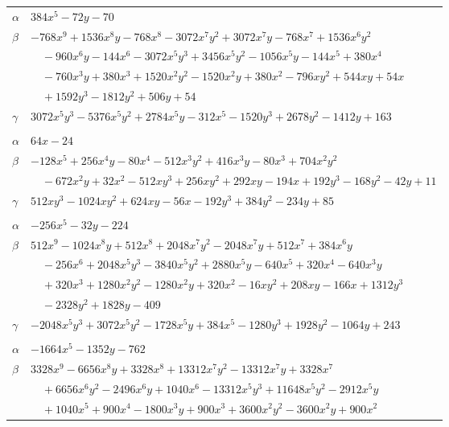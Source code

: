 \documentclass[11pt]{article}
\begin{document}
\begin{longtable}{@{}ll@{}}
$\alpha$ & $384x^{5}-72y-70$\\
$\beta$ & $-768x^{9}+1536x^{8}y-768x^{8}-3072x^{7}y^{2}+3072x^{7}y-768x^{7}+1536x^{6}y^{2}$\\
 & $\quad -960x^{6}y-144x^{6}-3072x^{5}y^{3}+3456x^{5}y^{2}-1056x^{5}y-144x^{5}+380x^{4}$\\
 & $\quad -760x^{3}y+380x^{3}+1520x^{2}y^{2}-1520x^{2}y+380x^{2}-796xy^{2}+544xy+54x$\\
 & $\quad +1592y^{3}-1812y^{2}+506y+54$\\
$\gamma$ & $3072x^{5}y^{3}-5376x^{5}y^{2}+2784x^{5}y-312x^{5}-1520y^{3}+2678y^{2}-1412y+163$\\
\addlinespace[3pt]
\multicolumn{2}{@{}l}{$\{i,j\}=\{3,31\}$, $k_{ij}=2\cdot 7^{2}$}\\
$\alpha$ & $64x-24$\\
$\beta$ & $-128x^{5}+256x^{4}y-80x^{4}-512x^{3}y^{2}+416x^{3}y-80x^{3}+704x^{2}y^{2}$\\
 & $\quad -672x^{2}y+32x^{2}-512xy^{3}+256xy^{2}+292xy-194x+192y^{3}-168y^{2}-42y+11$\\
$\gamma$ & $512xy^{3}-1024xy^{2}+624xy-56x-192y^{3}+384y^{2}-234y+85$\\
\addlinespace[3pt]
\multicolumn{2}{@{}l}{$\{i,j\}=\{3,34\}$, $k_{ij}=3\cdot 7^{2}$}\\
$\alpha$ & $-256x^{5}-32y-224$\\
$\beta$ & $512x^{9}-1024x^{8}y+512x^{8}+2048x^{7}y^{2}-2048x^{7}y+512x^{7}+384x^{6}y$\\
 & $\quad -256x^{6}+2048x^{5}y^{3}-3840x^{5}y^{2}+2880x^{5}y-640x^{5}+320x^{4}-640x^{3}y$\\
 & $\quad +320x^{3}+1280x^{2}y^{2}-1280x^{2}y+320x^{2}-16xy^{2}+208xy-166x+1312y^{3}$\\
 & $\quad -2328y^{2}+1828y-409$\\
$\gamma$ & $-2048x^{5}y^{3}+3072x^{5}y^{2}-1728x^{5}y+384x^{5}-1280y^{3}+1928y^{2}-1064y+243$\\
\addlinespace[3pt]
\multicolumn{2}{@{}l}{$\{i,j\}=\{3,37\}$, $k_{ij}=2^{2}\cdot 3^{2}\cdot 5^{2}$}\\
$\alpha$ & $-1664x^{5}-1352y-762$\\
$\beta$ & $3328x^{9}-6656x^{8}y+3328x^{8}+13312x^{7}y^{2}-13312x^{7}y+3328x^{7}$\\
 & $\quad +6656x^{6}y^{2}-2496x^{6}y+1040x^{6}-13312x^{5}y^{3}+11648x^{5}y^{2}-2912x^{5}y$\\
 & $\quad +1040x^{5}+900x^{4}-1800x^{3}y+900x^{3}+3600x^{2}y^{2}-3600x^{2}y+900x^{2}$\\

\end{longtable}
\end{document}
